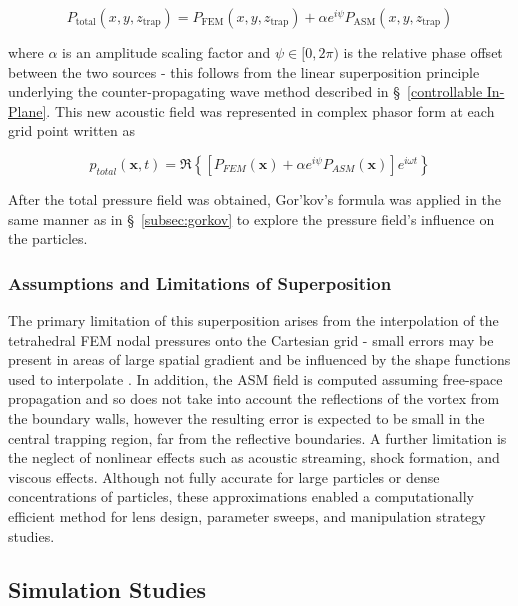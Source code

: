 \documentclass[11pt,a4paper]{article}
\begin{document}
\begin{equation}
P_{\text{total}}(x,y,z_{\mathrm{trap}})
=
P_{\text{FEM}}(x,y,z_{\mathrm{trap}})
+
\alpha e^{i\psi} P_{\text{ASM}}(x,y,z_{\mathrm{trap}})
\label{eq:phase-offset}
\end{equation}

\noindent where $\alpha$ is an amplitude scaling factor and $\psi \in [0,2\pi)$ is the relative phase offset between the two sources - this follows from the linear superposition principle underlying the counter-propagating wave method described in \S~\ref{controllable In-Plane}. This new acoustic field was represented in complex phasor form at each grid point written as

\begin{equation}
p_{total}(\mathbf{x},t)
=
\Re
\left\{
\left[
P_{FEM}(\mathbf{x})
+
\alpha e^{i\psi}
P_{ASM}(\mathbf{x})
\right]
e^{i \omega t}
\right\}
\end{equation}

\noindent After the total pressure field was obtained, Gor'kov's formula \cite{gorkov1962} was applied in the same manner as in \S~\ref{subsec:gorkov} to explore the pressure field's influence on the particles.
\\

\subsubsection{Assumptions and Limitations of Superposition}

The primary limitation of this superposition arises from the interpolation of the tetrahedral FEM nodal pressures onto the Cartesian grid - small errors may be present in areas of large spatial gradient and be influenced by the shape functions used to interpolate \cite{ihlenburg1998finite}. In addition, the ASM field is computed assuming free-space propagation and so does not take into account the reflections of the vortex from the boundary walls, however the resulting error is expected to be small in the central trapping region, far from the reflective boundaries. A further limitation is the neglect of nonlinear effects such as acoustic streaming, shock formation, and viscous effects. Although not fully accurate for large particles or dense concentrations of particles, these approximations enabled a computationally efficient method for lens design, parameter sweeps, and manipulation strategy studies.

\subsection{Simulation Studies}
\label{subsec:simulation-studies}
\end{document}
